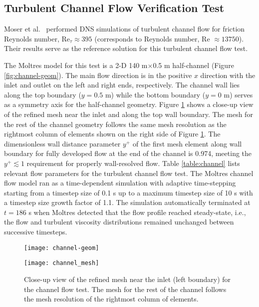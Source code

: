 \subsection{Turbulent Channel Flow Verification Test}

Moser et al.\ \cite{moser_direct_1999} performed \gls{DNS} simulations of turbulent channel flow
for friction Reynolds number, Re$_\tau\approx395$ (corresponds to Reynolds number, Re
$\approx 13750$). Their results serve as the reference solution for this turbulent channel flow
test.

The Moltres model for this test is a 2-D 140 m$\times$0.5 m half-channel
(Figure \ref{fig:channel-geom}). The main flow direction
is in the positive $x$ direction with the inlet and outlet on the left and right ends,
respectively. The channel wall lies along the top boundary ($y=0.5$ m) while the bottom boundary
($y=0$ m) serves as a symmetry axis for the half-channel geometry. Figure \ref{fig:channel-mesh}
shows a close-up view of the refined mesh near the inlet and along the top wall boundary. The mesh
for the rest of the channel geometry follows the same mesh resolution as the rightmost column of
elements shown on the right side of Figure \ref{fig:channel-mesh}. The dimensionless wall distance
parameter $y^+$ of the first mesh element along wall boundary for fully developed flow at the end
of the channel is 0.974, meeting the
$y^+ \lesssim 1$ requirement for properly wall-resolved flow. Table \ref{table:channel} lists
relevant flow parameters for the turbulent channel flow test. The Moltres channel flow model
ran as a time-dependent simulation with adaptive time-stepping starting from a timestep size of 0.1
s up to a maximum timestep size of 10 s with a timestep size growth factor of 1.1. The simulation
automatically terminated at $t=186$ s when Moltres detected that the flow profile reached
steady-state, i.e., the flow and turbulent viscosity distributions remained unchanged between
successive timesteps.

\begin{figure}[p]
  \centering
  \texttt{[image: channel-geom]}
  \caption{Channel geometry for the turbulent channel flow verification test. The red box indicates
  the region shown by the close-up view in Figure \ref{fig:channel-mesh}.}
  \label{fig:channel-geom}
  \centering
  \texttt{[image: channel\_mesh]}
  \caption{Close-up view of the refined mesh near the inlet (left boundary) for the channel flow
    test. The mesh for the rest of the channel follows the mesh resolution of the rightmost column
  of elements.}
  \label{fig:channel-mesh}
\end{figure}

